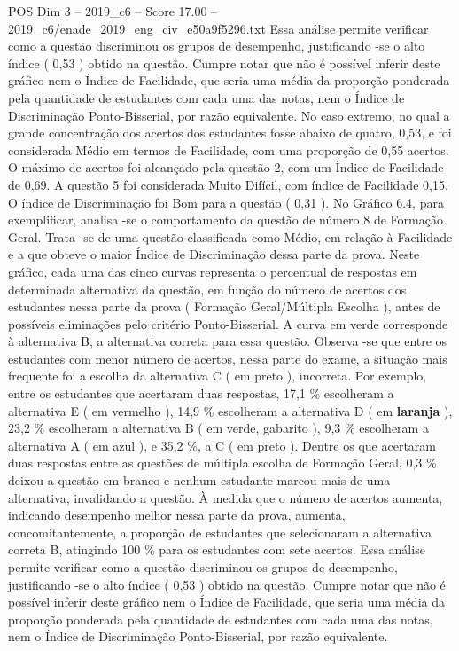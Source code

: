 \begin{textsample}{POS Dim 3 – 2019\_c6 – Score 17.00 – 2019\_c6/enade\_2019\_eng\_civ\_e50a9f5296.txt}
Essa análise permite verificar como a questão discriminou os grupos de desempenho, justificando -se o alto índice ( 0,53 ) obtido na questão.
Cumpre notar que não é possível inferir deste gráfico nem o Índice de Facilidade, que seria uma média da proporção ponderada pela quantidade de estudantes com cada uma das notas, nem o Índice de Discriminação Ponto-Bisserial, por razão equivalente.
No caso extremo, no qual a grande concentração dos acertos dos estudantes fosse abaixo de quatro, 0,53, e foi considerada Médio em termos de Facilidade, com uma proporção de 0,55 acertos.
O máximo de acertos foi alcançado pela questão 2, com um Índice de Facilidade de 0,69.
A questão 5 foi considerada Muito Difícil, com índice de Facilidade 0,15.
O índice de Discriminação foi Bom para a questão ( 0,31 ).
No Gráfico 6.4, para exemplificar, analisa -se o comportamento da questão de número 8 de Formação Geral.
Trata -se de uma questão classificada como Médio, em relação à Facilidade e a que obteve o maior Índice de Discriminação dessa parte da prova.
Neste gráfico, cada uma das cinco curvas representa o percentual de respostas em determinada alternativa da questão, em função do número de acertos dos estudantes nessa parte da prova ( Formação Geral/Múltipla Escolha ), antes de possíveis eliminações pelo critério Ponto-Bisserial.
A curva em verde corresponde à alternativa B, a alternativa correta para essa questão.
Observa -se que entre os estudantes com menor número de acertos, nessa parte do exame, a situação mais frequente foi a escolha da alternativa C ( em preto ), incorreta.
Por exemplo, entre os estudantes que acertaram duas respostas, 17,1 \% escolheram a alternativa E ( em vermelho ), 14,9 \% escolheram a alternativa D ( em \textbf{laranja} ), 23,2 \% escolheram a alternativa B ( em verde, gabarito ), 9,3 \% escolheram a alternativa A ( em azul ), e 35,2 \%, a C ( em preto ).
Dentre os que acertaram duas respostas entre as questões de múltipla escolha de Formação Geral, 0,3 \% deixou a questão em branco e nenhum estudante marcou mais de uma alternativa, invalidando a questão.
À medida que o número de acertos aumenta, indicando desempenho melhor nessa parte da prova, aumenta, concomitantemente, a proporção de estudantes que selecionaram a alternativa correta B, atingindo 100 \% para os estudantes com sete acertos.
Essa análise permite verificar como a questão discriminou os grupos de desempenho, justificando -se o alto índice ( 0,53 ) obtido na questão.
Cumpre notar que não é possível inferir deste gráfico nem o Índice de Facilidade, que seria uma média da proporção ponderada pela quantidade de estudantes com cada uma das notas, nem o Índice de Discriminação Ponto-Bisserial, por razão equivalente.

\end{textsample}
